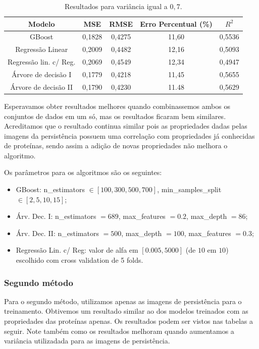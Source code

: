 \begin{table}[htpb!]
    \centering
    \caption{Resultados para variância igual a $0,7$.}
    \label{tab:var07}
    \begin{tabular}{@{}ccccc@{}}
    \toprule
    Modelo                 & MSE    & RMSE   & Erro Percentual (\%) & $R^2$  \\ \midrule
    GBoost                 & 0,1828 & 0,4275 & 11,60 & 0,5536 \\
    Regressão Linear       & 0,2009 & 0,4482 & 12,16 & 0,5093 \\
    Regressão lin. c/ Reg. & 0,2069 & 0,4549 & 12,34 & 0,4947 \\
    Árvore de decisão I    & 0,1779 & 0,4218 & 11,45 & 0,5655 \\
    Árvore de decisão II   & 0,1790 & 0,4230 & 11.48 & 0,5629 \\
    \bottomrule
    \end{tabular}
\end{table}

Esperavamos obter resultados melhores quando combinassemos ambos os conjuntos de dados em um só, mas
os resultados ficaram bem similares. Acreditamos que o resultado continua similar pois as propriedades
dadas pelas imagens da persistência possuem uma correlação com propriedades já conhecidas de proteínas, 
sendo assim a adição de novas propriedades não melhora o algoritmo. 

Os parâmetros para os algoritmos são os seguintes:
\begin{itemize}
    \item GBoost: n\_estimators $\in [100,300,500,700]$, min\_samples\_split $\in [2,5,10,15]$;
    \item Árv. Dec. I: n\_estimators $=689$, max\_features $=0.2$, max\_depth $=86$;
    \item Árv. Dec. II: n\_estimators $=500$, max\_depth $=100$, max\_features $=0.3$;
    \item Regressão Lin. c/ Reg: valor de alfa em $[0.005, 5000]$ (de $10$ em $10$) escolhido com 
     cross validation de 5 folds. 
\end{itemize}

\subsubsection{Segundo método}

Para o segundo método, utilizamos apenas as imagens de persistência para o treinamento. Obtivemos
um resultado similar ao dos modelos treinados com as propriedades das proteínas apenas. Os resultados
podem ser vistos nas tabelas a seguir. Note também como os resultados melhoram quando aumentamos
a variância utilizadada para as imagens de persistência. 


